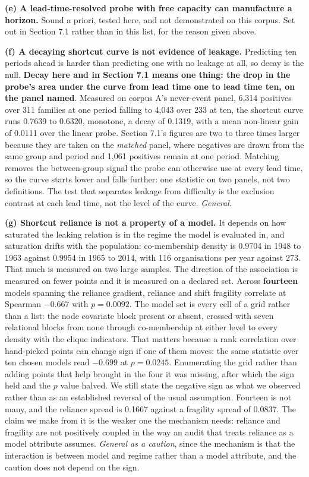 \documentclass[twoside,11pt]{article}
\begin{document}
\textbf{(e) A lead-time-resolved probe with free capacity can manufacture a horizon.} Sound a priori, tested here, and not demonstrated on this corpus. Set out in Section 7.1 rather than in this list, for the reason given above.

\textbf{(f) A decaying shortcut curve is not evidence of leakage.} Predicting ten periods ahead is harder than predicting one with no leakage at all, so decay is the null. \textbf{Decay here and in Section 7.1 means one thing: the drop in the probe's area under the curve from lead time one to lead time ten, on the panel named}. Measured on corpus A's never-event panel, 6,314 positives over 311 families at one period falling to 4,043 over 233 at ten, the shortcut curve runs 0.7639 to 0.6320, monotone, a decay of 0.1319, with a mean non-linear gain of 0.0111 over the linear probe. Section 7.1's figures are two to three times larger because they are taken on the \emph{matched} panel, where negatives are drawn from the same group and period and 1,061 positives remain at one period. Matching removes the between-group signal the probe can otherwise use at every lead time, so the curve starts lower and falls further: one statistic on two panels, not two definitions. The test that separates leakage from difficulty is the exclusion contrast at each lead time, not the level of the curve. \emph{General}.

\textbf{(g) Shortcut reliance is not a property of a model.} It depends on how saturated the leaking relation is in the regime the model is evaluated in, and saturation drifts with the population: co-membership density is 0.9704 in 1948 to 1963 against 0.9954 in 1965 to 2014, with 116 organisations per year against 273. That much is measured on two large samples. The direction of the association is measured on fewer points and it is measured on a declared set. Across \textbf{fourteen} models spanning the reliance gradient, reliance and shift fragility correlate at Spearman \(- 0.667\) with \(p = 0.0092\). The model set is every cell of a grid rather than a list: the node covariate block present or absent, crossed with seven relational blocks from none through co-membership at either level to every density with the clique indicators. That matters because a rank correlation over hand-picked points can change sign if one of them moves: the same statistic over ten chosen models read \(- 0.699\) at \(p = 0.0245\). Enumerating the grid rather than adding points that help brought in the four it was missing, after which the sign held and the \(p\) value halved. We still state the negative sign as what we observed rather than as an established reversal of the usual assumption. Fourteen is not many, and the reliance spread is 0.1667 against a fragility spread of 0.0837. The claim we make from it is the weaker one the mechanism needs: reliance and fragility are not positively coupled in the way an audit that treats reliance as a model attribute assumes. \emph{General as a caution}, since the mechanism is that the interaction is between model and regime rather than a model attribute, and the caution does not depend on the sign.
\end{document}
